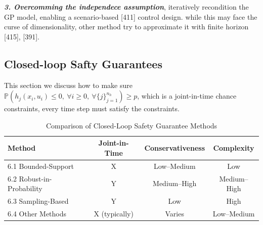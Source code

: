 \documentclass[10pt]{elegantbook}
\newcommand{\mydefination}[1]{\textbf{\textit{\textcolor{structurecolor}{#1}}}}
\begin{document}
\mydefination{3. Overcomming the independece assumption}, iteratively recondition the GP model, enabling a
scenario-based [411] control design. while this may face the curse of dimensionality, other method try to approximate it 
with finite horizon [415], [391].

\subsection{Closed-loop Safty Guarantees} \label{Safty_Guarantees}
This section we discuss how to make sure $\mathbb{P}(h_{j}(x_{i},u_{i})\leq0, ~ \forall i\geq0, ~ \forall\{j\}_{j=1}^{n_{h}}) \geq p$, which is a 
joint-in-time chance constraints, every time step must satisfy the constraints.
\begin{table}[h!]
\centering
\caption{Comparison of Closed-Loop Safety Guarantee Methods}
\renewcommand{\arraystretch}{1.3}
    \begin{tabular}{@{}lccc@{}}
    \toprule
    Method                    & Joint-in-Time          & Conservativeness & Complexity \\
    \midrule         
    6.1 Bounded-Support       & X                      & Low–Medium       & Low \\
    6.2 Robust-in-Probability & Y                      & Medium–High      & Medium–High \\
    6.3 Sampling-Based        & Y                      & Low              & High \\
    6.4 Other Methods         & X (typically)          & Varies           & Low–Medium \\
    \bottomrule
    \end{tabular}
\end{table}
\end{document}
